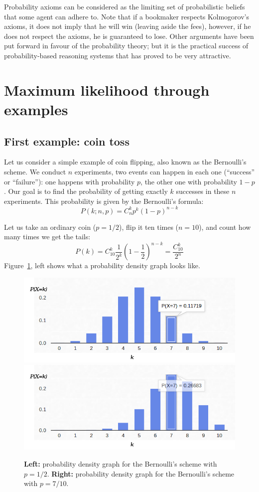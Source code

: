 \documentclass{article}
\begin{document}
Probability axioms can be considered as the limiting set of probabilistic beliefs that some agent can adhere to.
Note that if a bookmaker respects Kolmogorov's axioms, it does not imply that he will win (leaving aside the fees),
however, if he does not respect the axioms, he is guaranteed to lose.
Other arguments have been put forward in favour of the probability theory;
but it is the practical success of probability-based reasoning systems that has proved to be very attractive.


\section{Maximum likelihood through examples}
\subsection{First example: coin toss}
Let us consider a simple example of coin flipping, also known as the Bernoulli's scheme. 
We conduct $n$ experiments, two events can happen in each one (``success'' or ``failure''): 
one happens with probability $p$, the other one with probability $1-p$. 
Our goal is to find the probability of getting exactly $k$ successes in these $n$ experiments. 
This probability is given by the Bernoulli's formula:
$$
P(k;n,p) = C_n^k p^k (1-p)^{n-k}
$$

Let us take an ordinary coin ($p=1/2$), flip it ten times ($n=10$), and count how many times we get the tails:
$$P(k) = C_{10}^k \frac{1}{2^k}\left(1-\frac{1}{2}\right)^{n-k} = \frac{C_{10}^k}{2^n}$$
Figure~\ref{fig:binomial}, left shows what a probability density graph looks like.

\begin{figure}[htb!]
\centering
\includegraphics[width=.48\columnwidth]{binomial-05}
\includegraphics[width=.48\columnwidth]{binomial-07}
\caption{\textbf{Left:} probability density graph for the Bernoulli's scheme with $p=1/2$. \textbf{Right:} probability density graph for the Bernoulli's scheme with $p=7/10$.}
\label{fig:binomial}
\end{figure}
\end{document}
